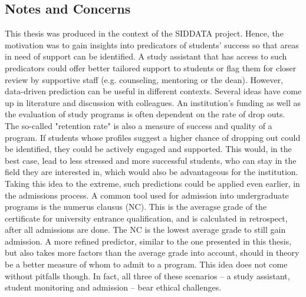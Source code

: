\subsection{Notes and Concerns}
This thesis was produced in the context of the SIDDATA project. Hence, the motivation was to gain insights into predicators of students' success so that areas in need of support can be identified. A study assistant that has access to such predicators could offer better tailored support to students or flag them for closer review by supportive staff (e.g. counseling, mentoring or the dean). However, data-driven prediction can be useful in different contexts. Several ideas have come up in literature and discussion with colleagues. An institution's funding as well as the evaluation of study programs is often dependent on the rate of drop outs. The so-called "retention rate" is also a measure of success and quality of a program. If students whose profiles suggest a higher chance of dropping out could be identified, they could be actively engaged and supported. This would, in the best case, lead to less stressed and more successful students, who can stay in the field they are interested in, which would also be advantageous for the institution. Taking this idea to the extreme, such predictions could be applied even earlier, in the admissions process. A common tool used for admission into undergraduate programs is the numerus clausus (NC). This is the averagse grade of the certificate for university entrance qualification, and is calculated in retrospect, after all admissions are done. The NC is the lowest average grade to still gain admission. A more refined predictor, similar to the one presented in this thesis, but also takes  more factors than the average grade into account, should in theory be a better measure of whom to admit to a program. This idea does not come without pitfalls though. In fact, all three of these scenarios -- a study assistant, student monitoring and admission -- bear ethical challenges\cite{Slade.2013, Aiken.2000, HighLevelExpertGrouponArtificialIntelligence.08.04.2019}.\\
